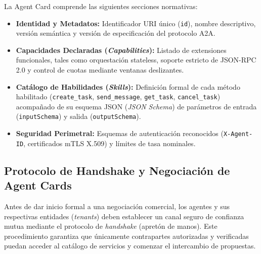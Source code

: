 La Agent Card comprende las siguientes secciones normativas:
\begin{itemize}
    \item \textbf{Identidad y Metadatos:} Identificador URI único (\texttt{id}), nombre descriptivo, versión semántica y versión de especificación del protocolo A2A.
    \item \textbf{Capacidades Declaradas (\textit{Capabilities}):} Listado de extensiones funcionales, tales como orquestación stateless, soporte estricto de JSON-RPC 2.0 y control de cuotas mediante ventanas deslizantes.
    \item \textbf{Catálogo de Habilidades (\textit{Skills}):} Definición formal de cada método habilitado (\texttt{create\_task}, \texttt{send\_message}, \texttt{get\_task}, \texttt{cancel\_task}) acompañado de su esquema JSON (\textit{JSON Schema}) de parámetros de entrada (\texttt{inputSchema}) y salida (\texttt{outputSchema}).
    \item \textbf{Seguridad Perimetral:} Esquemas de autenticación reconocidos (\texttt{X-Agent-ID}, certificados mTLS X.509) y límites de tasa nominales.
\end{itemize}

\subsection{Protocolo de Handshake y Negociación de Agent Cards}
Antes de dar inicio formal a una negociación comercial, los agentes y sus respectivas entidades (\textit{tenants}) deben establecer un canal seguro de confianza mutua mediante el protocolo de \textit{handshake} (apretón de manos). Este procedimiento garantiza que únicamente contrapartes autorizadas y verificadas puedan acceder al catálogo de servicios y comenzar el intercambio de propuestas.


